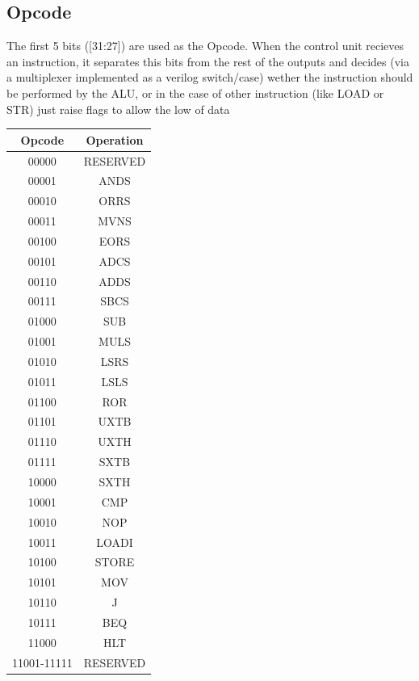 \documentclass[9pt,a4paper,twoside]{tau}
\begin{document}
        \subsection{Opcode}
        The first 5 bits ([31:27]) are used as the Opcode. When the control unit recieves an instruction, it separates this bits from the rest of the outputs and decides (via a multiplexer implemented as a verilog switch/case) wether the instruction should be performed by the ALU, or in the case of other instruction (like LOAD or STR) just raise flags to allow the low of data



        \begingroup
        {\centering
        \begin{tabular}{c|c}
        \textbf{Opcode} & \textbf{Operation} \\ \hline
        00000 & RESERVED \\
        00001 & ANDS \\
        00010 & ORRS \\
        00011 & MVNS \\
        00100 & EORS \\
        00101 & ADCS \\
        00110 & ADDS \\
        00111 & SBCS \\
        01000 & SUB \\
        01001 & MULS \\
        01010 & LSRS \\
        01011 & LSLS \\
        01100 & ROR \\
        01101 & UXTB \\
        01110 & UXTH \\
        01111 & SXTB \\
        10000 & SXTH \\
        10001 & CMP \\
        10010 & NOP \\
        10011 & LOADI \\
        10100 & STORE \\
        10101 & MOV \\
        10110 & J \\
        10111 & BEQ \\
        11000 & HLT \\
        11001-11111 & RESERVED \\
        \end{tabular}}
        \\
\end{document}
